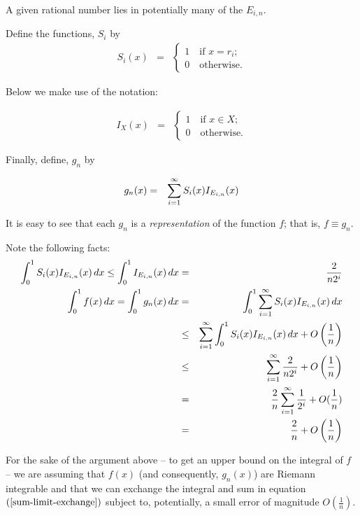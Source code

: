 \documentclass{article}
\begin{document}
A given rational number lies in potentially many of the $E_{i,n}$.

Define the functions, $S_i$ by
\begin{eqnarray}
	S_{i}(x) & = & \begin{cases} 1 \quad \text{if $x = r_i$}; \\ 
	 							  0 \quad \text{otherwise.} 
					\end{cases}
\end{eqnarray}

Below we make use of the notation: 

\begin{eqnarray}
I_X(x) & = & \begin{cases} 1 \quad \text{if $x \in X$}; \\ 0 \quad \text{otherwise.} \end{cases}
\end{eqnarray}

Finally, define, $g_n$ by

\begin{eqnarray}
	g_{n}(x) & = & \sum_{i=1}^\infty\limits S_{i}(x) I_{E_{i,n}}(x)
\end{eqnarray}

It is easy to see that each $g_n$ is a {\em representation\/} of the function $f$; 
that is, $f \equiv g_n$.

Note the following facts:
\begin{eqnarray}
	\int_0^1 S_{i}(x) I_{E_{i,n}}(x)\, dx \le \int_{0}^1 I_{E_{i,n}}(x) \, dx & = & \frac{2}{n2^{i}} \nonumber \\
	\int_0^1 f(x) \, dx = \int_0^1 g_n(x) \, dx & = & \int_0^1 \sum_{i=1}^\infty  S_{i}(x) I_{E_{i,n}}(x)\, dx  \label{sum-limit-exchange} \\
												& \le & \sum_{i=1}^\infty \int_0^1   S_{i}(x) I_{E_{i,n}}(x)\, dx  + O\left(\frac{1}{n}\right) \nonumber \\ 
												& \le & \sum_{i=1}^\infty\limits \frac{2}{n2^{i}} + O\left(\frac{1}{n}\right) \nonumber \\ 
												& =  & \frac{2}{n} \sum_{i=1}^\infty\limits \frac{1}{2^{i}}  + O(\frac{1}{n}) \nonumber \\
												& =  & \frac{2}{n} + O\left(\frac{1}{n}\right) \nonumber
 \end{eqnarray}

For the sake of the argument above -- to get an upper bound on the integral of $f$ -- we are assuming that 
$f(x)$ (and consequently, $g_n(x)$) are Riemann integrable and that we 
can exchange the integral and sum in equation $(\ref{sum-limit-exchange})$ subject to, potentially, a small error of magnitude $O(\frac{1}{n})$.
\end{document}
